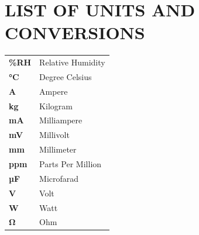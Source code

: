 \documentclass[../main.tex]{subfiles}
\begin{document}
\section*{LIST OF UNITS AND CONVERSIONS}

\vspace{1em}  %

\begin{tabular}{@{}ll}
\textbf{\%RH} & Relative Humidity \\
\textbf{°C}   & Degree Celsius \\
\textbf{A}    & Ampere \\
\textbf{kg}   & Kilogram \\
\textbf{mA}   & Milliampere \\
\textbf{mV}   & Millivolt \\
\textbf{mm}   & Millimeter \\
\textbf{ppm}  & Parts Per Million \\
\textbf{µF}   & Microfarad \\
\textbf{V}    & Volt \\
\textbf{W}    & Watt \\
\textbf{Ω}    & Ohm \\
\end{tabular}
\end{document}
